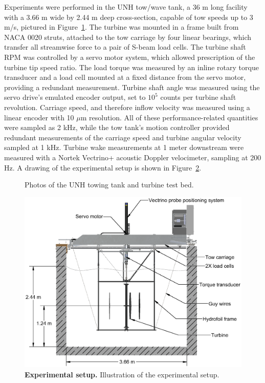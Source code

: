 \documentclass[10pt,letterpaper]{article}
\begin{document}
Experiments were performed in the UNH tow/wave tank, a 36 m long facility with a
3.66 m wide by 2.44 m deep cross-section, capable of tow speeds up to 3 m/s,
pictured in Figure~\ref{fig:tow-tank}. The turbine was mounted in a frame built
from NACA 0020 struts, attached to the tow carriage by four linear bearings,
which transfer all streamwise force to a pair of S-beam load cells. The turbine
shaft RPM was controlled by a servo motor system, which allowed prescription of
the turbine tip speed ratio. The load torque was measured by an inline rotary
torque transducer and a load cell mounted at a fixed distance from the servo
motor, providing a redundant measurement. Turbine shaft angle was measured using
the servo drive's emulated encoder output, set to $10^5$ counts per turbine
shaft revolution. Carriage speed, and therefore inflow velocity was measured
using a linear encoder with 10 $\mu$m resolution. All of these
performance-related quantities were sampled as 2 kHz, while the tow tank's
motion controller provided redundant measurements of the carriage speed and
turbine angular velocity sampled at 1 kHz. Turbine wake measurements at 1 meter
downstream were measured with a Nortek Vectrino+ acoustic Doppler velocimeter,
sampling at 200 Hz. A drawing of the experimental setup is shown in
Figure~\ref{fig:exp-setup}.


\begin{figure}[h]
\caption{Photos of the UNH towing tank and turbine test bed.} 
\label{fig:tow-tank}
\end{figure}

\begin{figure}[h]
\centering
\includegraphics[clip,trim=0.01in 0 0 0,
width=\textwidth]{figures/tank_cross_section}
\caption{{\bf Experimental setup.} Illustration of the experimental setup.}
\label{fig:exp-setup}
\end{figure}
\end{document}
